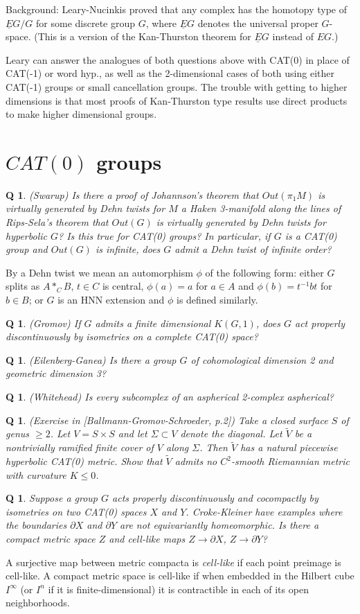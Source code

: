 \documentclass[11pt]{article}
\newtheorem{q}[thm]{Q}
\theoremstyle{remark}
\def\b{\begin{q}}
\def\e{\end{q}}
\newcommand{\<}{\langle}
\renewcommand{\>}{\rangle}
\begin{document}
Background: Leary-Nucinkis proved that any complex has the homotopy 
type of $\underline EG/G$ for some discrete group $G$, where
$\underline EG$ denotes 
the universal proper $G$-space.  (This is a version of the
Kan-Thurston 
theorem for $\underline EG$ instead of $EG$.)  

Leary can answer the analogues of both questions above with CAT(0) 
in place of CAT(-1) or word hyp., as well as the 2-dimensional 
cases of both using either CAT(-1) groups or small cancellation 
groups. The trouble with getting to higher dimensions is that 
most proofs of Kan-Thurston type results use direct products to 
make higher dimensional groups.  

\section{$CAT(0)$ groups}


\b
(Swarup) Is there a proof of Johannson's theorem that $Out(\pi_1
M)$ is virtually generated by Dehn twists for $M$ a Haken 3-manifold
along the lines of Rips-Sela's theorem that $Out(G)$ is virtually
generated by Dehn twists for hyperbolic $G$? Is this true for CAT(0)
groups? In particular, if $G$ is a CAT(0) group and $Out(G)$ is
infinite, does $G$ admit a Dehn twist of infinite order? 
\e
By a Dehn
twist we mean an automorphism $\phi$ of the following form: either $G$
splits as $A*_CB$, $t\in C$ is central, $\phi(a)=a$ for $a\in A$ and
$\phi(b)=t^{-1}bt$ for $b\in B$; or $G$ is an HNN extension and $\phi$
is defined similarly.



\b
(Gromov) If $G$ admits a finite dimensional $K(G,1)$, does
$G$ act properly discontinuously by isometries on a complete CAT(0)
space?
\e

\b
(Eilenberg-Ganea) Is there a group $G$ of cohomological dimension 2 and
geometric dimension 3?\e

\b
(Whitehead) Is every subcomplex of an aspherical 2-complex aspherical?\e



\b
(Exercise in [Ballmann-Gromov-Schroeder, p.2]) Take a closed
surface $S$ of genus $\geq 2$. Let $V=S\times S$ and let
$\Sigma\subset V$ denote the diagonal. Let $\tilde V$ be a
nontrivially ramified finite cover of $V$ along $\Sigma$. Then $\tilde
V$ has a natural piecewise hyperbolic CAT(0) metric. Show that $\tilde
V$ admits no $C^2$-smooth Riemannian metric with curvature $K\leq 0$.\e

\b
Suppose a group $G$ acts properly discontinuously and cocompactly
by isometries on two CAT(0) spaces $X$ and $Y$. Croke-Kleiner have
examples where the boundaries $\partial X$ and $\partial Y$ are not
equivariantly homeomorphic. Is there a compact metric space $Z$ and
cell-like maps $Z\to\partial X$, $Z\to\partial Y$? \e
A surjective map
between metric compacta is {\it cell-like} if each point preimage is
cell-like. A compact metric space is cell-like if when embedded in the
Hilbert cube $I^\infty$ (or $I^n$ if it is finite-dimensional) it is
contractible in each of its open neighborhoods.
\end{document}
